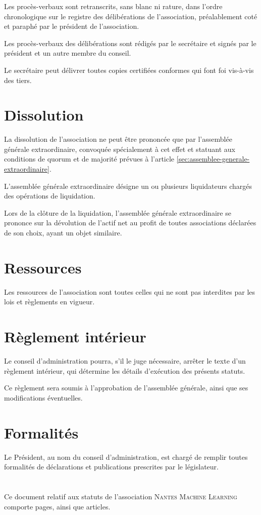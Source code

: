 \documentclass{article}
\newcommand{\Nom}{\textsc{Nantes Machine Learning}} %
\begin{document}
Les procès-verbaux sont retranscrits, sans blanc ni rature, dans
l'ordre chronologique sur le registre des délibérations de
l'association, préalablement coté et paraphé par le président de
l'association.

Les procès-verbaux des délibérations sont rédigés par le secrétaire et
signés par le président et un autre membre du conseil.

Le secrétaire peut délivrer toutes copies certifiées conformes qui
font foi vis-à-vis des tiers.

\section{Dissolution}
\label{sec:dissolution}

La dissolution de l'association ne peut être prononcée que par
l'assemblée générale extraordinaire, convoquée spécialement à cet
effet et statuant aux conditions de quorum et de majorité prévues à
l'article \ref{sec:assemblee-generale-extraordinaire}.

L'assemblée générale extraordinaire désigne un ou plusieurs
liquidateurs chargés des opérations de liquidation.

Lors de la clôture de la liquidation, l'assemblée générale
extraordinaire se prononce sur la dévolution de l'actif net au profit
de toutes associations déclarées de son choix, ayant un objet
similaire.

\section{Ressources}
\label{sec:ressources}

Les ressources de l'association sont toutes celles qui ne sont pas
interdites par les lois et règlements en vigueur.

\section{Règlement intérieur}
\label{sec:reglement-interieur}

Le conseil d'administration pourra, s'il le juge nécessaire, arrêter
le texte d'un règlement intérieur, qui détermine les détails
d'exécution des présents statuts.

Ce règlement sera soumis à l'approbation de l'assemblée générale,
ainsi que ses modifications éventuelles.

\section{Formalités}
\label{sec:formalites}

Le Président, au nom du conseil d'administration, est chargé de remplir toutes formalités de déclarations et publications prescrites par le législateur.

\section*{}

Ce document relatif aux statuts de l'association \Nom{} comporte
\pageref{LastPage} pages, ainsi que  articles.
\end{document}

